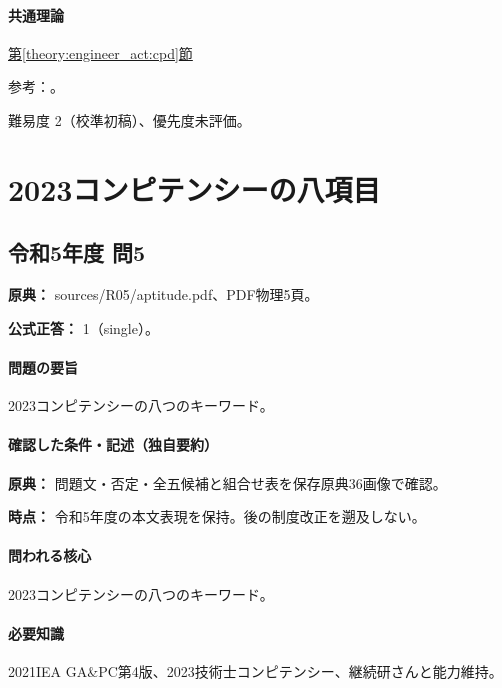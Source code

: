 \paragraph{共通理論} \hyperref[theory:engineer_act:cpd]{第\ref*{theory:engineer_act:cpd}節}

\par 参考：\cite{cpd_new2021,cpd_v3}。

\par 難易度 2（校準初稿）、優先度未評価。

\section{2023コンピテンシーの八項目}

\subsection{令和5年度 問5}
\label{q:r05-reg-apt-05}

\noindent\textbf{原典：} sources/R05/aptitude.pdf、PDF物理5頁。

\textbf{公式正答：} 1（single）。

\paragraph{問題の要旨} 2023コンピテンシーの八つのキーワード。

\paragraph{確認した条件・記述（独自要約）}\mbox{}\par

\noindent\textbf{原典：} 問題文・否定・全五候補と組合せ表を保存原典36画像で確認。\par

\noindent\textbf{時点：} 令和5年度の本文表現を保持。後の制度改正を遡及しない。\par

\paragraph{問われる核心} 2023コンピテンシーの八つのキーワード。

\paragraph{必要知識} 2021IEA GA\&PC第4版、2023技術士コンピテンシー、継続研さんと能力維持。

